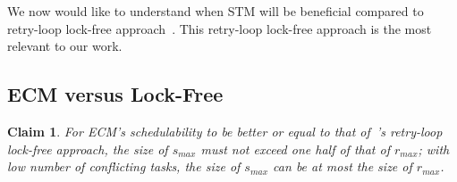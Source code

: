 \documentclass{sig-alternate}
\newtheorem{clm}{Claim}
\begin{document}
We now would like to understand when STM will be beneficial compared to retry-loop lock-free approach~\cite{key-5}. This retry-loop lock-free approach is the most relevant to our work. 


\subsection{\label{sub:G-EDF-scheduler-with} ECM versus Lock-Free}

\begin{clm}
For ECM's schedulability to be better or equal to that of~\cite{key-5}'s retry-loop lock-free approach,  
the size of $s_{max}$ must not exceed one half of that of $r_{max}$; with low number of conflicting tasks, the size of $s_{max}$ can be at most the size of $r_{max}$. 
\end{clm}
\end{document}
